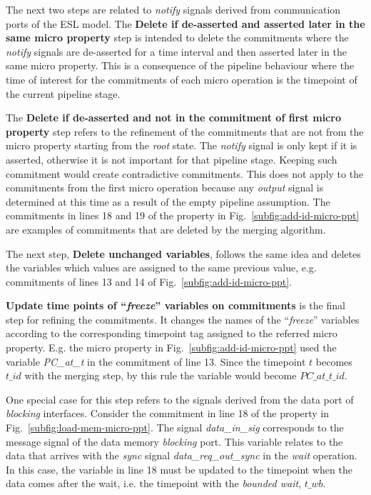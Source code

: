 The next two steps are related to \textit{notify} signals derived from communication ports of the ESL model. The \textbf{Delete if de-asserted and asserted later in the same micro property} step is intended to delete the commitments where the \textit{notify} signals are de-asserted for a time interval and then asserted later in the same micro property. This is a consequence of the pipeline behaviour where the time of interest for the commitments of each micro operation is the timepoint of the current pipeline stage.

The \textbf{Delete if de-asserted and not in the commitment of first micro property} step refers to the refinement of the commitments that are not from the micro property starting from the \textit{root} state. The \textit{notify} signal is only kept if it is asserted, otherwise it is not important for that pipeline stage. Keeping such commitment would create contradictive commitments. This does not apply to the commitments from the first micro operation because any \textit{output} signal is determined at this time as a result of the empty pipeline assumption. The commitments in lines 18 and 19 of the property in Fig.~\ref{subfig:add-id-micro-ppt} are examples of commitments that are deleted by the merging algorithm.

The next step, \textbf{Delete unchanged variables}, follows the same idea and deletes the variables which values are assigned to the same previous value, e.g. commitments of lines 13 and 14 of Fig.~\ref{subfig:add-id-micro-ppt}.

\textbf{Update time points of “\textit{freeze}” variables on commitments} is the final step for refining the commitments. It changes the names of the “\textit{freeze}” variables according to the corresponding timepoint tag assigned to the referred micro property. E.g. the micro property in Fig.~\ref{subfig:add-id-micro-ppt} used the variable \textit{PC\_at\_t} in the commitment of line 13. Since the timepoint $t$ becomes $t\_id$ with the merging step, by this rule the variable would become $PC\_at\_t\_id$. 

One special case for this step refers to the signals derived from the data port of \textit{blocking} interfaces. Consider the commitment in line 18 of the property in Fig.~\ref{subfig:load-mem-micro-ppt}. The signal \textit{data\_in\_sig} corresponds to the message signal of the data memory \textit{blocking} port. This variable relates to the data that arrives with the \textit{sync} signal \textit{data\_req\_out\_sync} in the \textit{wait} operation. In this case, the variable in line 18 must be updated to the timepoint when the data comes after the wait, i.e. the timepoint with the \textit{bounded wait}, $t\_wb$.

